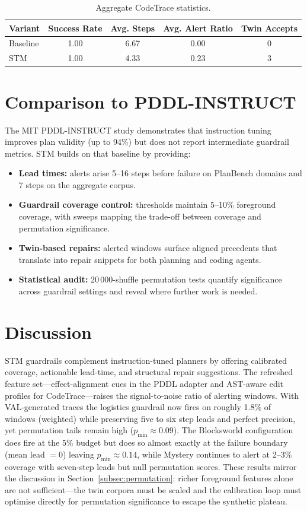 \documentclass[11pt]{article}
\begin{document}
\begin{table}[h]
  \centering
  \caption{Aggregate CodeTrace statistics.}
  \label{tab:codetrace-aggregate}
  \begin{tabular}{lcccc}
    \toprule
    Variant & Success Rate & Avg. Steps & Avg. Alert Ratio & Twin Accepts \\
    \midrule
    Baseline & 1.00 & 6.67 & 0.00 & 0 \\
    STM & 1.00 & 4.33 & 0.23 & 3 \\
    \bottomrule
  \end{tabular}
\end{table}

\section{Comparison to PDDL-INSTRUCT}
The MIT PDDL-INSTRUCT study \cite{verma2025pddlinstruct} demonstrates that
instruction tuning improves plan validity (up to 94\%) but does not report
intermediate guardrail metrics. STM builds on that baseline by providing:
\begin{itemize}
  \item \textbf{Lead times:} alerts arise 5--16 steps before failure on PlanBench
  domains and 7 steps on the aggregate corpus.
  \item \textbf{Guardrail coverage control:} thresholds maintain 5--10\% foreground
  coverage, with sweeps mapping the trade-off between coverage and permutation
  significance.
  \item \textbf{Twin-based repairs:} alerted windows surface aligned precedents
  that translate into repair snippets for both planning and coding agents.
  \item \textbf{Statistical audit:} 20\,000-shuffle permutation tests quantify
  significance across guardrail settings and reveal where further work is needed.
\end{itemize}

\section{Discussion}
STM guardrails complement instruction-tuned planners by offering calibrated
coverage, actionable lead-time, and structural repair suggestions. The refreshed
feature set---effect-alignment cues in the PDDL adapter and AST-aware edit
profiles for CodeTrace---raises the signal-to-noise ratio of alerting windows.
With VAL-generated traces the logistics guardrail now fires on roughly
1.8\% of windows (weighted) while preserving five to six step leads and perfect
precision, yet permutation tails remain high ($p_{\min}\approx 0.09$). The
Blocksworld configuration does fire at the 5\% budget but does so almost exactly
at the failure boundary (mean lead $=0$) leaving $p_{\min}\approx 0.14$, while
Mystery continues to alert at 2--3\% coverage with seven-step leads but null
permutation scores. These results mirror the discussion in
Section~\ref{subsec:permutation}: richer foreground features alone are not
sufficient—the twin corpora must be scaled and the calibration loop must
optimise directly for permutation significance to escape the synthetic plateau.
\end{document}
